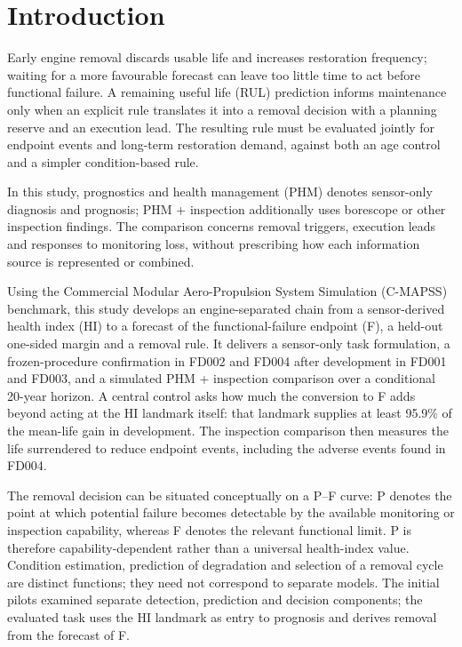 \documentclass[preprint,12pt]{elsarticle}
\begin{document}
\section{Introduction}\label{sec:intro}

Early engine removal discards usable life and increases restoration frequency; waiting for a more favourable forecast can leave too little time to act before functional failure. A remaining useful life (RUL) prediction informs maintenance only when an explicit rule translates it into a removal decision with a planning reserve and an execution lead. The resulting rule must be evaluated jointly for endpoint events and long-term restoration demand, against both an age control and a simpler condition-based rule.

In this study, prognostics and health management (PHM) denotes sensor-only diagnosis and prognosis; PHM + inspection additionally uses borescope or other inspection findings. The comparison concerns removal triggers, execution leads and responses to monitoring loss, without prescribing how each information source is represented or combined.

Using the Commercial Modular Aero-Propulsion System Simulation (C-MAPSS) benchmark, this study develops an engine-separated chain from a sensor-derived health index (HI) to a forecast of the functional-failure endpoint (F), a held-out one-sided margin and a removal rule. It delivers a sensor-only task formulation, a frozen-procedure confirmation in FD002 and FD004 after development in FD001 and FD003, and a simulated PHM + inspection comparison over a conditional 20-year horizon. A central control asks how much the conversion to F adds beyond acting at the HI landmark itself: that landmark supplies at least 95.9\% of the mean-life gain in development. The inspection comparison then measures the life surrendered to reduce endpoint events, including the adverse events found in FD004.

The removal decision can be situated conceptually on a P--F curve: P denotes the point at which potential failure becomes detectable by the available monitoring or inspection capability, whereas F denotes the relevant functional limit. P is therefore capability-dependent rather than a universal health-index value. Condition estimation, prediction of degradation and selection of a removal cycle are distinct functions; they need not correspond to separate models. The initial pilots examined separate detection, prediction and decision components; the evaluated task uses the HI landmark as entry to prognosis and derives removal from the forecast of F.
\end{document}
